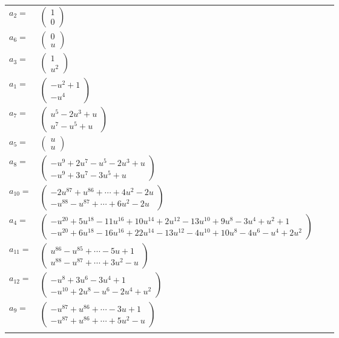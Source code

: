 \documentclass[1p]{elsarticle_modified}
\theoremstyle{definition}
\begin{document}
\begin{tabular}{m{7pt} m{180pt} m{7pt} m{180pt} }
\flushright $a_{2}=$&$\begin{pmatrix}1\\0\end{pmatrix}$ \\
\flushright $a_{6}=$&$\begin{pmatrix}0\\u\end{pmatrix}$ \\
\flushright $a_{3}=$&$\begin{pmatrix}1\\u^2\end{pmatrix}$ \\
\flushright $a_{1}=$&$\begin{pmatrix}- u^2+1\\- u^4\end{pmatrix}$ \\
\flushright $a_{7}=$&$\begin{pmatrix}u^5-2 u^3+u\\u^7- u^5+u\end{pmatrix}$ \\
\flushright $a_{5}=$&$\begin{pmatrix}u\\u\end{pmatrix}$ \\
\flushright $a_{8}=$&$\begin{pmatrix}- u^9+2 u^7- u^5-2 u^3+u\\- u^9+3 u^7-3 u^5+u\end{pmatrix}$ \\
\flushright $a_{10}=$&$\begin{pmatrix}-2 u^{87}+u^{86}+\cdots+4 u^2-2 u\\- u^{88}- u^{87}+\cdots+6 u^2-2 u\end{pmatrix}$ \\
\flushright $a_{4}=$&$\begin{pmatrix}- u^{20}+5 u^{18}-11 u^{16}+10 u^{14}+2 u^{12}-13 u^{10}+9 u^8-3 u^4+u^2+1\\- u^{20}+6 u^{18}-16 u^{16}+22 u^{14}-13 u^{12}-4 u^{10}+10 u^8-4 u^6- u^4+2 u^2\end{pmatrix}$ \\
\flushright $a_{11}=$&$\begin{pmatrix}u^{86}- u^{85}+\cdots-5 u+1\\u^{88}- u^{87}+\cdots+3 u^2- u\end{pmatrix}$ \\
\flushright $a_{12}=$&$\begin{pmatrix}- u^8+3 u^6-3 u^4+1\\- u^{10}+2 u^8- u^6-2 u^4+u^2\end{pmatrix}$ \\
\flushright $a_{9}=$&$\begin{pmatrix}- u^{87}+u^{86}+\cdots-3 u+1\\- u^{87}+u^{86}+\cdots+5 u^2- u\end{pmatrix}$\\&\end{tabular}
\end{document}
